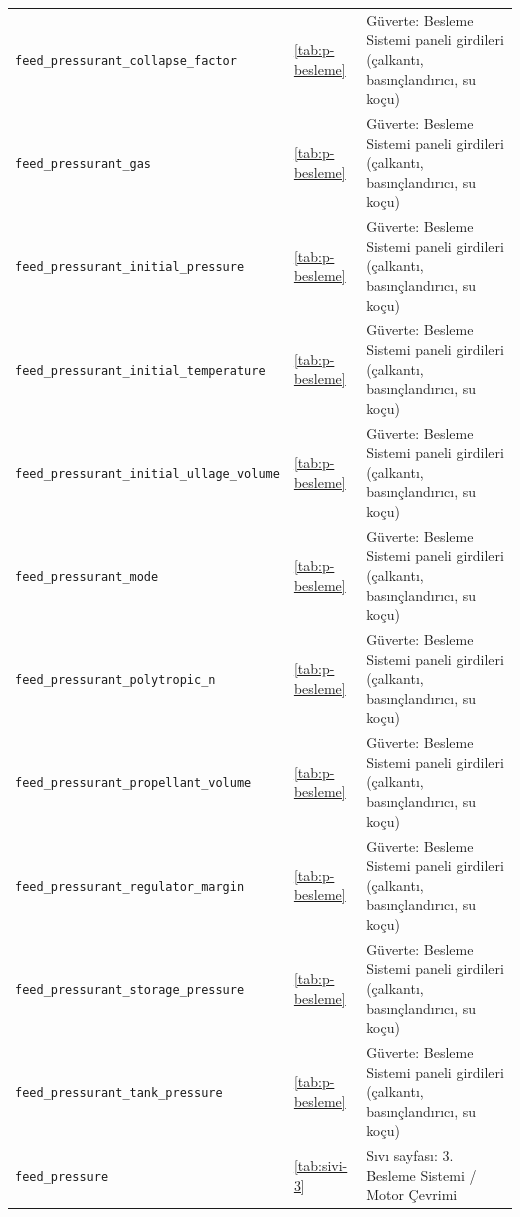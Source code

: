 \documentclass[11pt,a4paper]{article}
\begin{document}
{\begin{longtable}{@{}>{\raggedright\arraybackslash}p{5.2cm}p{1.4cm}>{\raggedright\arraybackslash}p{7.4cm}@{}}
\texttt{feed\_\allowbreak{}pressurant\_\allowbreak{}collapse\_\allowbreak{}factor} & \ref{tab:p-besleme} & Güverte: Besleme Sistemi paneli girdileri (çalkantı, basınçlandırıcı, su koçu) \\
\texttt{feed\_\allowbreak{}pressurant\_\allowbreak{}gas} & \ref{tab:p-besleme} & Güverte: Besleme Sistemi paneli girdileri (çalkantı, basınçlandırıcı, su koçu) \\
\texttt{feed\_\allowbreak{}pressurant\_\allowbreak{}initial\_\allowbreak{}pressure} & \ref{tab:p-besleme} & Güverte: Besleme Sistemi paneli girdileri (çalkantı, basınçlandırıcı, su koçu) \\
\texttt{feed\_\allowbreak{}pressurant\_\allowbreak{}initial\_\allowbreak{}temperature} & \ref{tab:p-besleme} & Güverte: Besleme Sistemi paneli girdileri (çalkantı, basınçlandırıcı, su koçu) \\
\texttt{feed\_\allowbreak{}pressurant\_\allowbreak{}initial\_\allowbreak{}ullage\_\allowbreak{}volume} & \ref{tab:p-besleme} & Güverte: Besleme Sistemi paneli girdileri (çalkantı, basınçlandırıcı, su koçu) \\
\texttt{feed\_\allowbreak{}pressurant\_\allowbreak{}mode} & \ref{tab:p-besleme} & Güverte: Besleme Sistemi paneli girdileri (çalkantı, basınçlandırıcı, su koçu) \\
\texttt{feed\_\allowbreak{}pressurant\_\allowbreak{}polytropic\_\allowbreak{}n} & \ref{tab:p-besleme} & Güverte: Besleme Sistemi paneli girdileri (çalkantı, basınçlandırıcı, su koçu) \\
\texttt{feed\_\allowbreak{}pressurant\_\allowbreak{}propellant\_\allowbreak{}volume} & \ref{tab:p-besleme} & Güverte: Besleme Sistemi paneli girdileri (çalkantı, basınçlandırıcı, su koçu) \\
\texttt{feed\_\allowbreak{}pressurant\_\allowbreak{}regulator\_\allowbreak{}margin} & \ref{tab:p-besleme} & Güverte: Besleme Sistemi paneli girdileri (çalkantı, basınçlandırıcı, su koçu) \\
\texttt{feed\_\allowbreak{}pressurant\_\allowbreak{}storage\_\allowbreak{}pressure} & \ref{tab:p-besleme} & Güverte: Besleme Sistemi paneli girdileri (çalkantı, basınçlandırıcı, su koçu) \\
\texttt{feed\_\allowbreak{}pressurant\_\allowbreak{}tank\_\allowbreak{}pressure} & \ref{tab:p-besleme} & Güverte: Besleme Sistemi paneli girdileri (çalkantı, basınçlandırıcı, su koçu) \\
\texttt{feed\_\allowbreak{}pressure} & \ref{tab:sivi-3} & Sıvı sayfası: 3. Besleme Sistemi / Motor Çevrimi \\

\end{longtable}}
\end{document}
